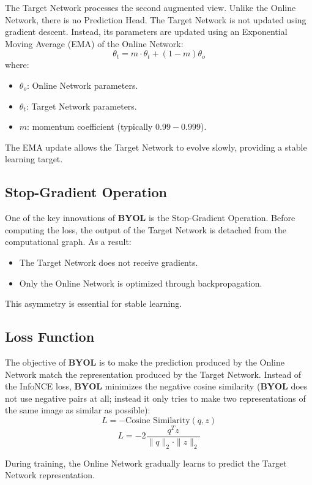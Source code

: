 The Target Network processes the second augmented view. Unlike the Online Network, there is no Prediction Head. The Target Network is not updated using gradient descent. Instead, its parameters are updated using an Exponential Moving Average (EMA) of the Online Network:
\[
\theta_t = m \cdot \theta_t + (1 - m) \theta_o
\]
where:
\begin{itemize}
    \item $\theta_o$: Online Network parameters.
    \item $\theta_t$: Target Network parameters.
    \item $m$: momentum coefficient (typically $0.99 - 0.999$).
\end{itemize}

The EMA update allows the Target Network to evolve slowly, providing a stable learning target.

\subsection{Stop-Gradient Operation}

One of the key innovations of \textbf{BYOL} is the Stop-Gradient Operation. Before computing the loss, the output of the Target Network is detached from the computational graph. As a result:
\begin{itemize}
    \item The Target Network does not receive gradients.
    \item Only the Online Network is optimized through backpropagation.
\end{itemize}

This asymmetry is essential for stable learning.

\subsection{Loss Function}

The objective of \textbf{BYOL} is to make the prediction produced by the Online Network match the representation produced by the Target Network. Instead of the InfoNCE loss, \textbf{BYOL} minimizes the negative cosine similarity (\textbf{BYOL} does not use negative pairs at all; instead it only tries to make two representations of the same image as similar as possible):
\[
L = -\text{Cosine Similarity}(q, z)
\]
\[
L = -2 \frac{q^T z}{\|q\|_2 \cdot \|z\|_2}
\]

During training, the Online Network gradually learns to predict the Target Network representation.

